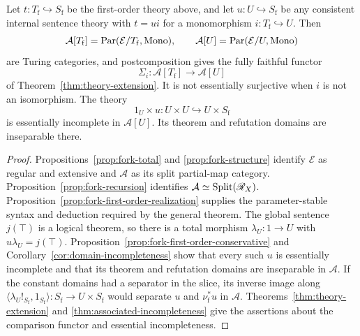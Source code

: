 \begin{corollary}\label{cor:fork-associated-theories}
Let $t:T_{\mathrm f}\hookrightarrow S_{\mathrm f}$ be the
first-order theory above, and let
$u:U\hookrightarrow S_{\mathrm f}$ be any consistent internal
sentence theory with $t=ui$ for a monomorphism
$i:T_{\mathrm f}\hookrightarrow U$. Then
\[
 \mathcal A[T_{\mathrm f}]=\operatorname{Par}(\mathcal E/T_{\mathrm f},\operatorname{Mono}),
 \qquad
 \mathcal A[U]=\operatorname{Par}(\mathcal E/U,\operatorname{Mono})
\]
are Turing categories, and postcomposition gives the fully
faithful functor
\[
 \Sigma_i:\mathcal A[T_{\mathrm f}]\longrightarrow\mathcal A[U]
\]
of Theorem~\ref{thm:theory-extension}. It is not essentially
surjective when $i$ is not an isomorphism. The theory
\[
 1_U\times u:U\times U\hookrightarrow U\times S_{\mathrm f}
\]
is essentially incomplete in $\mathcal A[U]$. Its theorem and
refutation domains are inseparable there.
\end{corollary}
\begin{proof}
Propositions~\ref{prop:fork-total} and
\ref{prop:fork-structure} identify $\mathcal E$ as regular and
extensive and $\mathcal A$ as its split partial-map category.
Proposition~\ref{prop:fork-recursion} identifies
$\mathcal A\simeq\operatorname{Split}(\mathscr R_X)$.
Proposition~\ref{prop:fork-first-order-realization} supplies the
parameter-stable syntax and deduction required by the general
theorem. The global sentence $j(\top)$ is a logical theorem, so
there is a total morphism $\lambda_U:1\to U$ with $u\lambda_U=j(\top)$.
Proposition~\ref{prop:fork-first-order-conservative} and
Corollary~\ref{cor:domain-incompleteness} show that every such
$u$ is essentially incomplete and that its theorem and
refutation domains are inseparable in $\mathcal A$. If the constant
domains had a separator in the slice, its inverse image along
$\langle \lambda_U !_{S_{\mathrm f}},1_{S_{\mathrm f}}\rangle:
 S_{\mathrm f}\to U\times S_{\mathrm f}$ would separate $u$ and
$\nu_{\mathrm f}^*u$ in $\mathcal A$.
Theorems~\ref{thm:theory-extension} and
\ref{thm:associated-incompleteness} give the assertions about the
comparison functor and essential incompleteness.
\end{proof}
